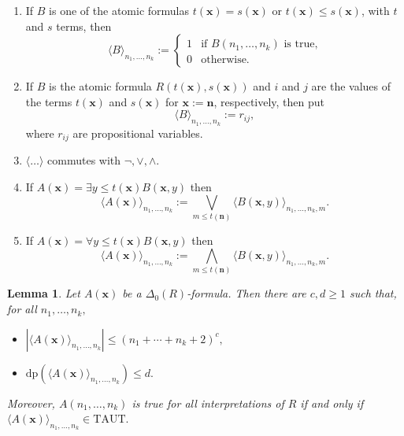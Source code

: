 \documentclass{article}
\theoremstyle{plain}
\newtheorem{lemma}[theorem]{Lemma}
\theoremstyle{definition}
\newcommand{\tuple}{\mathbf}
\begin{document}
\begin{enumerate}
    \item If $B$ is one of the atomic formulas $t(\tuple{x}) = s(\tuple{x})$ or $t(\tuple{x}) \le s(\tuple{x})$, with $t$ and $s$ terms, then
    \[
    \langle B \rangle_{n_1, \ldots, n_k} :=
    \begin{cases}
        1 & \text{if } B(n_1, \ldots, n_k) \text{ is true,} \\
        0 & \text{otherwise.}
    \end{cases}
    \]
    
    \item If $B$ is the atomic formula $R(t(\tuple{x}), s(\tuple{x}))$ and $i$ and $j$ are the values of the terms $t(\tuple{x})$ and $s(\tuple{x})$ for $\tuple{x} := \tuple{n}$, respectively, then put
    \[
    \langle B \rangle_{n_1, \ldots, n_k} := r_{ij},
    \]
    where $r_{ij}$ are propositional variables.
    
    \item $\langle \ldots \rangle$ commutes with $\neg, \lor, \land.$
    
    \item If $A(\tuple{x}) = \exists y \le t(\tuple{x}) B(\tuple{x}, y)$ then
    \[
    \langle A(\tuple{x}) \rangle_{n_1, \ldots, n_k} := 
    \bigvee_{m \le t(\tuple{n})}
    \langle B(\tuple{x}, y) \rangle_{n_1, \ldots, n_k, m}.
    \]
    
    \item If $A(\tuple{x}) = \forall y \le t(\tuple{x}) B(\tuple{x}, y)$ then
    \[
    \langle A(\tuple{x}) \rangle_{n_1, \ldots, n_k} := 
    \bigwedge_{m \le t(\tuple{n})}
    \langle B(\tuple{x}, y) \rangle_{n_1, \ldots, n_k, m}.
    \]
\end{enumerate}

\begin{lemma}
Let $A(\tuple{x})$ be a $\Delta_0(R)$-formula. Then there are $c, d \ge 1$ such that, for all $n_1, \ldots, n_k,$
\begin{itemize}
    \item $|\langle A(\tuple{x}) \rangle_{n_1, \ldots, n_k}| \le (n_1 + \cdots + n_k + 2)^c,$
    \item $\mathrm{dp}(\langle A(\tuple{x}) \rangle_{n_1, \ldots, n_k}) \le d.$
\end{itemize}

\noindent Moreover, $A(n_1, \ldots, n_k)$ is true for all interpretations of $R$ if and only if 
\\$\langle A(\tuple{x}) \rangle_{n_1, \ldots, n_k}\in \mathrm{TAUT}.$
\end{lemma}
\end{document}
